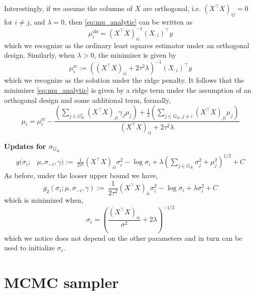 \documentclass[12pt]{article}
\begin{document}
Interestingly, if we assume the columns of $X$ are orthogonal, i.e. $ (X^\top X)_{ij} = 0$ for $i \neq j$, and $\lambda = 0$, then \eqref{eq:mu_analytic} can be written as
\begin{equation}
    \mu_i^{\text{ols}} = (X^\top X)_{ii}^{-1} (X_{:i})^\top y
\end{equation}
which we recognize as the ordinary least squares estimator under an orthogonal design. Similarly, when $\lambda > 0$, the minimizer is given by
\begin{equation}
    \mu_i^{\text{rr}} := \left((X^\top X)_{ii} + 2\tau^2 \lambda \right)^{-1} (X_{:i})^\top y
\end{equation}
which we recognize as the solution under the ridge penalty. It follows that the minimizer \eqref{eq:mu_analytic} is given by a ridge term under the assumption of an orthogonal design and some additional term, formally,
\begin{equation}
    \mu_i = \mu_i^{\text{rr}} - \frac{
	\left(\sum_{j \in G_K^c} (X^\top X)_{ji} \gamma_{J} \mu_j \right) +
	\frac{1}{2} \left(\sum_{j \in G_K, j\neq i} (X^\top X)_{ji} \mu_j \right)
    }{
	(X^\top X)_{ii} +
	2 \tau^2 \lambda 
    }
\end{equation}

\textbf{Updates for $\sigma_{G_K}$}
\begin{equation}
\begin{aligned}
    g(\sigma_i;& \mu, \sigma_{-i}, \gamma) :=\
    \frac{1}{2\tau^2} (X^\top X)_{ii} \sigma_i^2
-
    \log{\sigma_i}
+
    \lambda \left( \sum_{j \in G_K} 
	\sigma_j^2 + \mu_j^2
    \right)^{1/2} + C
\end{aligned}
\end{equation}
As before, under the looser upper bound we have,
\begin{equation}
    g_2 (\sigma_i; \mu, \sigma_{-i}, \gamma) :=\
    \frac{1}{2\tau^2} (X^\top X)_{ii} \sigma_i^2
-
    \log{\sigma_i}
+
    \lambda \sigma_i^2 + C
\end{equation}
which is minimized when,
\begin{equation}
    \sigma_i = \left( \frac{(X^\top X)_{ii}}{\sigma^2} + 2 \lambda \right)^{-1/2}
\end{equation}
which we notice does not depend on the other parameters and in turn can be used to initialize $\sigma_i$.



\section{MCMC sampler}
\end{document}
